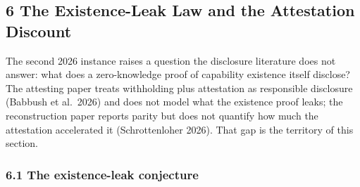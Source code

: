\documentclass[
]{llncs}
\begin{document}
\subsection{6 The Existence-Leak Law and the Attestation
Discount}\label{the-existence-leak-law-and-the-attestation-discount}

The second 2026 instance raises a question the disclosure literature
does not answer: what does a zero-knowledge proof of capability
existence itself disclose? The attesting paper treats withholding plus
attestation as responsible disclosure (Babbush et al.~2026) and does not
model what the existence proof leaks; the reconstruction paper reports
parity but does not quantify how much the attestation accelerated it
(Schrottenloher 2026). That gap is the territory of this section.

\subsubsection{6.1 The existence-leak
conjecture}\label{the-existence-leak-conjecture}
\end{document}
